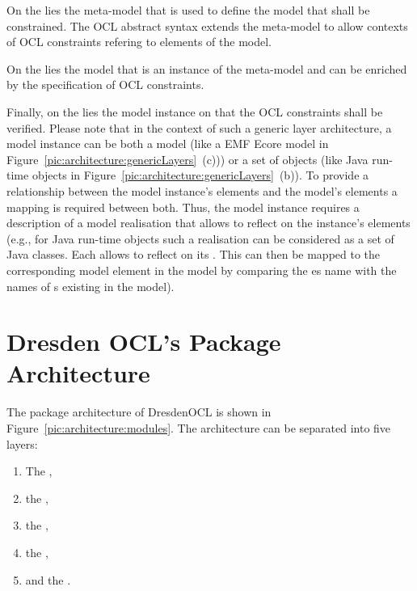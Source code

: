 On the  lies 
the meta-model that is used to define the model that shall be constrained. The
\acs{OCL} abstract syntax extends the meta-model to allow contexts of \acs{OCL}
constraints refering to elements of the model.

On the  lies the model that is an instance of the meta-model
and can be enriched by the specification of \acs{OCL} constraints. 

Finally, on the  lies the model instance on that the 
\acs{OCL} constraints shall be verified. Please note that in the context of 
such a generic layer architecture, a model instance can be both a model (like a
\acs{EMF} Ecore model in Figure~\ref{pic:architecture:genericLayers}~(c))) or a
set of objects (like Java run-time objects in
Figure~\ref{pic:architecture:genericLayers}~(b)). To provide a relationship
between the model instance's elements and the model's elements a mapping is
required between both. Thus, the model instance requires a description of a
model realisation that allows to reflect on the instance's elements (e.g., for
Java run-time objects such a realisation can be considered as a set of Java
classes. Each  allows to reflect on its
. This  can then be mapped to the
corresponding model element in the model by comparing the es name
with the names of s existing in the model).



\section{Dresden OCL's Package Architecture}

The package architecture of DresdenOCL is shown in
Figure~\ref{pic:architecture:modules}. The architecture can be separated into
five layers: 

\begin{enumerate}
  \item The ,
  \item the ,
  \item the ,
  \item the ,
  \item and the .
\end{enumerate}

